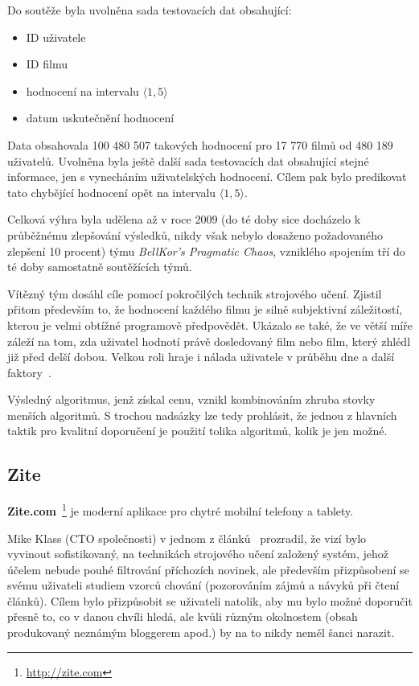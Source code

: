 \documentclass[thesis=M,czech]{FITthesis}[2014/05/07]
\begin{document}
Do soutěže byla uvolněna sada testovacích dat obsahující:

\begin{itemize}
	\item ID uživatele
	\item ID filmu
	\item hodnocení na intervalu $\langle1,5\rangle$
	\item datum uskutečnění hodnocení
\end{itemize}

Data obsahovala 100 480 507 takových hodnocení pro 17 770 filmů od 480 189 uživatelů. Uvolněna byla ještě další sada testovacích dat obsahující stejné informace, jen s vynecháním uživatelských hodnocení. Cílem pak bylo predikovat tato chybějící hodnocení opět na intervalu $\langle1,5\rangle$.

Celková výhra byla udělena až v roce 2009 (do té doby sice docházelo k průběžnému zlepšování výsledků, nikdy však nebylo dosaženo požadovaného zlepšení 10 procent) týmu \emph{BellKor's Pragmatic Chaos}, vzniklého spojením tří do té doby samostatně soutěžících týmů.

Vítězný tým dosáhl cíle pomocí pokročilých technik strojového učení. Zjistil přitom především to, že hodnocení každého filmu je silně subjektivní záležitostí, kterou je velmi obtížné programově předpovědět. Ukázalo se také, že ve větší míře záleží na tom, zda uživatel hodnotí právě dosledovaný film nebo film, který zhlédl již před delší dobou. Velkou roli hraje i nálada uživatele v průběhu dne a další faktory~\cite{bellkor}.

Výsledný algoritmus, jenž získal cenu, vznikl kombinováním zhruba stovky menších algoritmů. S trochou nadsázky lze tedy prohlásit, že jednou z hlavních taktik pro kvalitní doporučení je použití tolika algoritmů, kolik je jen možné.

\subsection{Zite}

\textbf{Zite.com}~\footnote{\url{http://zite.com}} je moderní aplikace pro chytré mobilní telefony a tablety.

Mike Klass (CTO společnosti) v jednom z článků~\cite{ziteflip} prozradil, že vizí bylo vyvinout sofistikovaný, na technikách strojového učení založený systém, jehož účelem nebude pouhé filtrování příchozích novinek, ale především přizpůsobení se svému uživateli studiem vzorců chování (pozorováním zájmů a návyků při čtení článků). Cílem bylo přizpůsobit se uživateli natolik, aby mu bylo možné doporučit přesně to, co v danou chvíli hledá, ale kvůli různým okolnostem (obsah produkovaný neznámým bloggerem apod.) by na to nikdy neměl šanci narazit.
\end{document}
